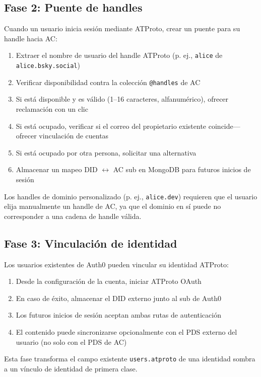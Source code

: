 \documentclass[10pt,letterpaper,twocolumn]{article}
\begin{document}
\subsection{Fase 2: Puente de handles}

Cuando un usuario inicia sesión mediante ATProto, crear un puente para su handle hacia AC:

\begin{enumerate}
  \item Extraer el nombre de usuario del handle ATProto (p. ej., \texttt{alice} de \texttt{alice.bsky.social})
  \item Verificar disponibilidad contra la colección \texttt{@handles} de AC
  \item Si está disponible y es válido (1--16 caracteres, alfanumérico), ofrecer reclamación con un clic
  \item Si está ocupado, verificar si el correo del propietario existente coincide---ofrecer vinculación de cuentas
  \item Si está ocupado por otra persona, solicitar una alternativa
  \item Almacenar un mapeo DID $\leftrightarrow$ AC sub en MongoDB para futuros inicios de sesión
\end{enumerate}

Los handles de dominio personalizado (p. ej., \texttt{alice.dev}) requieren que el usuario elija manualmente un handle de AC, ya que el dominio en sí puede no corresponder a una cadena de handle válida.

\subsection{Fase 3: Vinculación de identidad}

Los usuarios existentes de Auth0 pueden vincular su identidad ATProto:

\begin{enumerate}
  \item Desde la configuración de la cuenta, iniciar ATProto OAuth
  \item En caso de éxito, almacenar el DID externo junto al sub de Auth0
  \item Los futuros inicios de sesión aceptan ambas rutas de autenticación
  \item El contenido puede sincronizarse opcionalmente con el PDS externo del usuario (no solo con el PDS de AC)
\end{enumerate}

Esta fase transforma el campo existente \texttt{users.atproto} de una identidad sombra a un vínculo de identidad de primera clase.
\end{document}
